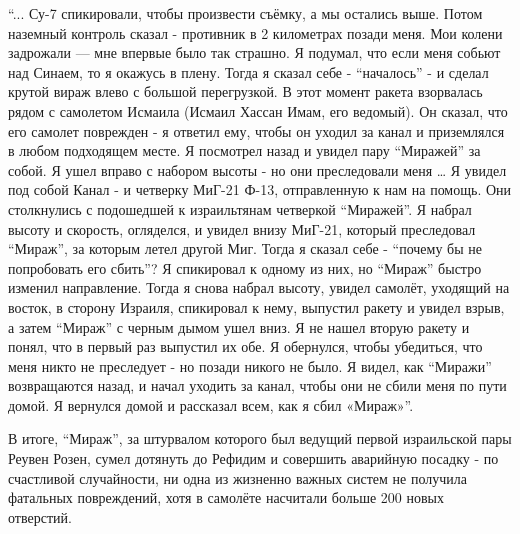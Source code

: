 \begin{textcitation}
	“... Су-7 спикировали, чтобы произвести съёмку, а мы остались выше. Потом наземный контроль сказал - противник в 2 километрах позади меня. Мои колени задрожали — мне впервые было так страшно. Я подумал, что если меня собьют над Синаем, то я окажусь в плену. Тогда я сказал себе - “началось” - и сделал крутой вираж влево с большой перегрузкой. В этот момент ракета взорвалась рядом с самолетом Исмаила (Исмаил Хассан Имам, его ведомый). Он сказал, что его самолет поврежден - я ответил ему, чтобы он уходил за канал и приземлялся в любом подходящем месте. Я посмотрел назад и увидел пару “Миражей” за собой. Я ушел вправо с набором высоты - но они преследовали меня … Я увидел под собой Канал - и четверку МиГ-21 Ф-13, отправленную к нам на помощь. Они столкнулись с подошедшей к израильтянам четверкой “Миражей”. Я набрал высоту и скорость, огляделся, и увидел внизу МиГ-21, который преследовал “Мираж”, за которым летел другой Миг. Тогда я сказал себе - “почему бы не попробовать его сбить”? Я спикировал к одному из них, но “Мираж” быстро изменил направление. Тогда я снова набрал высоту, увидел самолёт, уходящий на восток, в сторону Израиля, спикировал к нему, выпустил ракету и увидел взрыв, а затем “Мираж” с черным дымом ушел вниз. Я не нашел вторую ракету и понял, что в первый раз выпустил их обе. Я обернулся, чтобы убедиться, что меня никто не преследует - но позади никого не было. Я видел, как “Миражи” возвращаются назад, и начал уходить за канал, чтобы они не сбили меня по пути домой. Я вернулся домой и рассказал всем, как я сбил «Мираж»”.
\end{textcitation}

В итоге, “Мираж”, за штурвалом которого был ведущий первой израильской пары Реувен Розен, сумел дотянуть до Рефидим и совершить аварийную посадку - по счастливой случайности, ни одна из жизненно важных систем не получила фатальных повреждений, хотя в самолёте насчитали больше 200 новых отверстий.

